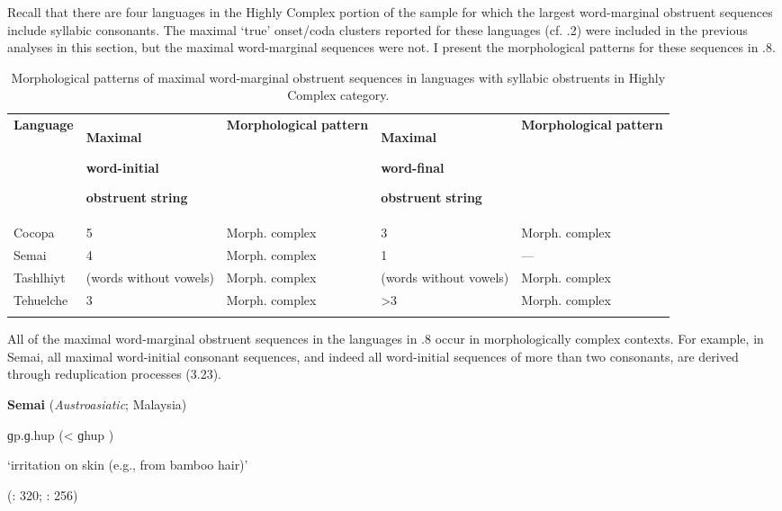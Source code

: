   Recall that there are four languages in the Highly Complex portion of the sample for which the largest word-marginal obstruent sequences include syllabic consonants. The maximal ‘true’ onset/coda clusters reported for these languages (cf. .2) were included in the previous analyses in this section, but the maximal word-marginal sequences were not. I present the morphological patterns for these sequences in .8.

\begin{table}
\begin{tabularx}{\textwidth}{XXXXX}
\lsptoprule

\textbf{Language} & { \textbf{Maximal} }

{ \textbf{word-initial} }

 \textbf{obstruent} \textbf{string} & \textbf{Morphological} \textbf{pattern} & { \textbf{Maximal} }

{ \textbf{word-final} }

 \textbf{obstruent} \textbf{string} & \textbf{Morphological} \textbf{pattern}\\
Cocopa & 5 & Morph. complex & 3 & Morph. complex\\
Semai & 4 & Morph. complex & 1 & —\\
Tashlhiyt & (words without vowels) & Morph. complex & (words without vowels) & Morph. complex\\
Tehuelche & 3 & Morph. complex & >3 & Morph. complex\\
\lspbottomrule
\end{tabularx}
\caption{\label{3.8}Morphological patterns of maximal word-marginal obstruent sequences in languages with syllabic obstruents in Highly Complex category.}
\end{table}

  All of the maximal word-marginal obstruent sequences in the languages in .8 occur in morphologically complex contexts. For example, in Semai, all maximal word-initial consonant sequences, and indeed all word-initial sequences of more than two consonants, are derived through reduplication processes (3.23).

\ea\label{ex:(3.23)}
  \textbf{Semai} (\textit{Austroasiatic}; Malaysia)

ɡp.ɡ.hup (< ɡhup )

‘irritation on skin (e.g., from bamboo hair)’

(\citealt{Sloan1988}: 320; \citealt{Diffloth1976a}: 256)

\z

